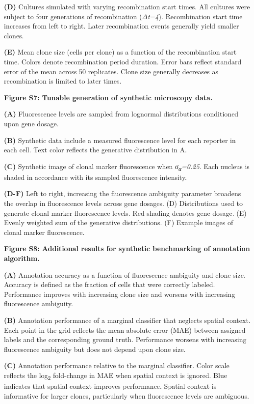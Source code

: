 \textbf{(D)} Cultures simulated with varying recombination start times. All cultures were subject to four generations of recombination (\emph{Δt=4}). Recombination start time increases from left to right. Later recombination events generally yield smaller clones.

\textbf{(E)} Mean clone size (cells per clone) as a function of the recombination start time. Colors denote recombination period duration. Error bars reflect standard error of the mean across 50 replicates. Clone size generally decreases as recombination is limited to later times.

\textbf{Figure S7: Tunable generation of synthetic microscopy data.}

\textbf{(A)} Fluorescence levels are sampled from lognormal distributions conditioned upon gene dosage.

\textbf{(B)} Synthetic data include a measured fluorescence level for each reporter in each cell. Text color reflects the generative distribution in A.

\textbf{(C)} Synthetic image of clonal marker fluorescence when \emph{σ\textsubscript{α}=0.25}. Each nucleus is shaded in accordance with its sampled fluorescence intensity.

\textbf{(D-F)} Left to right, increasing the fluorescence ambiguity parameter broadens the overlap in fluorescence levels across gene dosages. (D) Distributions used to generate clonal marker fluorescence levels. Red shading denotes gene dosage. (E) Evenly weighted sum of the generative distributions. (F) Example images of clonal marker fluorescence.

\textbf{Figure S8: Additional results for synthetic benchmarking of annotation algorithm.}

\textbf{(A)} Annotation accuracy as a function of fluorescence ambiguity and clone size. Accuracy is defined as the fraction of cells that were correctly labeled. Performance improves with increasing clone size and worsens with increasing fluorescence ambiguity.

\textbf{(B)} Annotation performance of a marginal classifier that neglects spatial context. Each point in the grid reflects the mean absolute error (MAE) between assigned labels and the corresponding ground truth. Performance worsens with increasing fluorescence ambiguity but does not depend upon clone size.

\textbf{(C)} Annotation performance relative to the marginal classifier. Color scale reflects the log\textsubscript{2} fold-change in MAE when spatial context is ignored. Blue indicates that spatial context improves performance. Spatial context is informative for larger clones, particularly when fluorescence levels are ambiguous.

